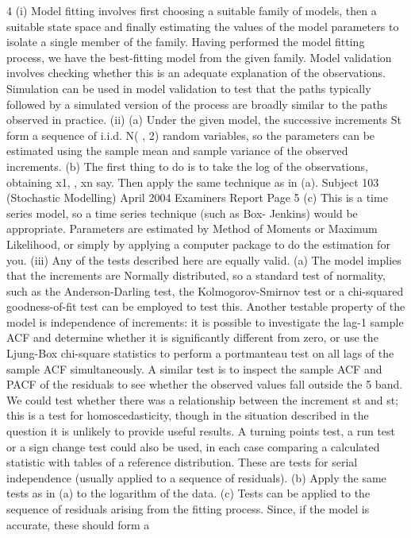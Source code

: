 4 (i) Model fitting involves first choosing a suitable family of models, then a
suitable state space and finally estimating the values of the model parameters
to isolate a single member of the family.
Having performed the model fitting process, we have the best-fitting model
from the given family. Model validation involves checking whether this is an
adequate explanation of the observations.
Simulation can be used in model validation to test that the paths typically
followed by a simulated version of the process are broadly similar to the paths
observed in practice.
(ii) (a) Under the given model, the successive increments St form a
sequence of i.i.d. N( , 2) random variables, so the parameters can be
estimated using the sample mean and sample variance of the observed
increments.
(b) The first thing to do is to take the log of the observations, obtaining x1,
, xn say. Then apply the same technique as in (a).
Subject 103 (Stochastic Modelling) April 2004 Examiners Report
Page 5
(c) This is a time series model, so a time series technique (such as Box-
Jenkins) would be appropriate.
Parameters are estimated by Method of Moments or Maximum
Likelihood, or simply by applying a computer package to do the
estimation for you.
(iii) Any of the tests described here are equally valid.
(a) The model implies that the increments are Normally distributed, so a
standard test of normality, such as the Anderson-Darling test, the
Kolmogorov-Smirnov test or a chi-squared goodness-of-fit test can be
employed to test this.
Another testable property of the model is independence of increments:
it is possible to investigate the lag-1 sample ACF and determine
whether it is significantly different from zero, or use the Ljung-Box
chi-square statistics to perform a portmanteau test on all lags of the
sample ACF simultaneously.
A similar test is to inspect the sample ACF and PACF of the residuals
to see whether the observed values fall outside the 5%
band.
We could test whether there was a relationship between the increment
st and st; this is a test for homoscedasticity, though in the situation
described in the question it is unlikely to provide useful results.
A turning points test, a run test or a sign change test could also be
used, in each case comparing a calculated statistic with tables of a
reference distribution. These are tests for serial independence (usually
applied to a sequence of residuals).
(b) Apply the same tests as in (a) to the logarithm of the data.
(c) Tests can be applied to the sequence of residuals arising from the
fitting process. Since, if the model is accurate, these should form a
